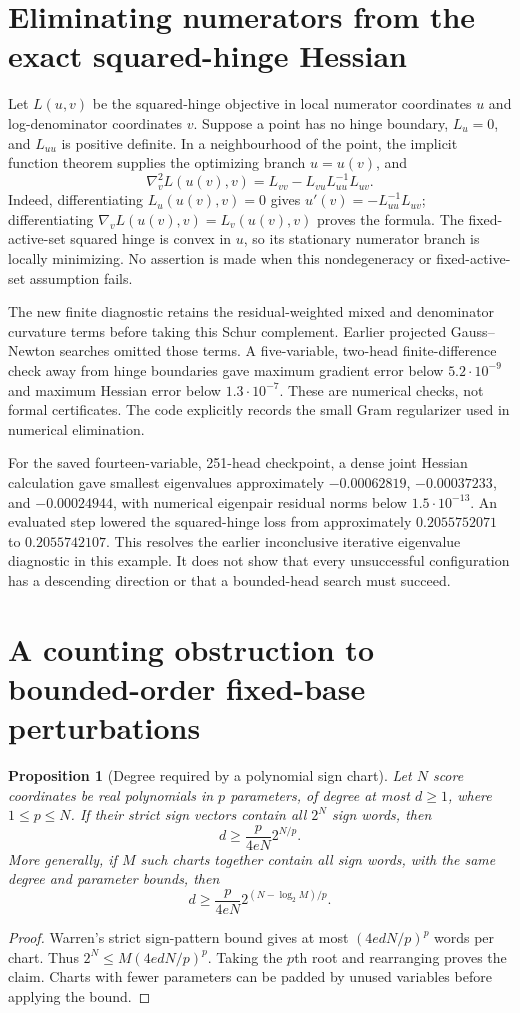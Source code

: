 \documentclass[11pt]{article}
\newtheorem{proposition}{Proposition}
\begin{document}
\section{Eliminating numerators from the exact squared-hinge Hessian}

Let $L(u,v)$ be the squared-hinge objective in local numerator
coordinates $u$ and log-denominator coordinates $v$. Suppose a
point has no hinge boundary, $L_u=0$, and $L_{uu}$ is positive
definite. In a neighbourhood of the point, the implicit function
theorem supplies the optimizing branch $u=u(v)$, and
\[
 \nabla_v^2 L(u(v),v)=
 L_{vv}-L_{vu}L_{uu}^{-1}L_{uv}.
\]
Indeed, differentiating $L_u(u(v),v)=0$ gives
$u'(v)=-L_{uu}^{-1}L_{uv}$; differentiating
$\nabla_v L(u(v),v)=L_v(u(v),v)$ proves the formula.
The fixed-active-set squared hinge is convex in $u$, so its
stationary numerator branch is locally minimizing. No assertion
is made when this nondegeneracy or fixed-active-set assumption fails.

The new finite diagnostic retains the residual-weighted mixed
and denominator curvature terms before taking this Schur
complement. Earlier projected Gauss--Newton searches omitted
those terms. A five-variable, two-head finite-difference check
away from hinge boundaries gave maximum gradient error below
$5.2\cdot10^{-9}$ and maximum Hessian error below
$1.3\cdot10^{-7}$. These are numerical checks, not formal
certificates. The code explicitly records the small Gram
regularizer used in numerical elimination.

For the saved fourteen-variable, 251-head checkpoint, a dense
joint Hessian calculation gave smallest eigenvalues approximately
$-0.00062819$, $-0.00037233$, and $-0.00024944$, with numerical
eigenpair residual norms below $1.5\cdot10^{-13}$. An evaluated
step lowered the squared-hinge loss from approximately
$0.2055752071$ to $0.2055742107$. This resolves the earlier
inconclusive iterative eigenvalue diagnostic in this example.
It does not show that every unsuccessful configuration has a
descending direction or that a bounded-head search must succeed.

\section{A counting obstruction to bounded-order fixed-base perturbations}

\begin{proposition}[Degree required by a polynomial sign chart]
Let $N$ score coordinates be real polynomials in $p$ parameters,
of degree at most $d\ge1$, where $1\le p\le N$. If their strict
sign vectors contain all $2^N$ sign words, then
\[
 d\ge\frac{p}{4eN}2^{N/p}.
\]
More generally, if $M$ such charts together contain all sign words,
with the same degree and parameter bounds, then
\[
 d\ge\frac{p}{4eN}2^{(N-\log_2 M)/p}.
\]
\end{proposition}
\begin{proof}
Warren's strict sign-pattern bound gives at most
$(4edN/p)^p$ words per chart. Thus
$2^N\le M(4edN/p)^p$. Taking the $p$th root and rearranging
proves the claim. Charts with fewer parameters can be padded by
unused variables before applying the bound.
\end{proof}
\end{document}
